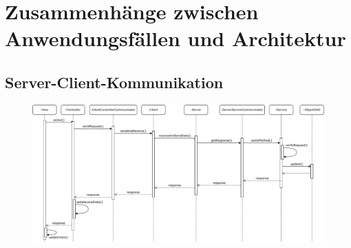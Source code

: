 \documentclass[fontsize=12pt,paper=a4,twoside]{scrartcl}
\begin{document}




\section{Zusammenhänge zwischen Anwendungsfällen und Architektur}
 \label{sec:anwendungsfaelle}

\subsection{Server-Client-Kommunikation}

\begin{figure}[H]
\begin{center}
  \includegraphics[width=\linewidth]{UML/Server_client_Sequenzdiagramm.pdf}
\end{center}
\end{figure}
\end{document}
